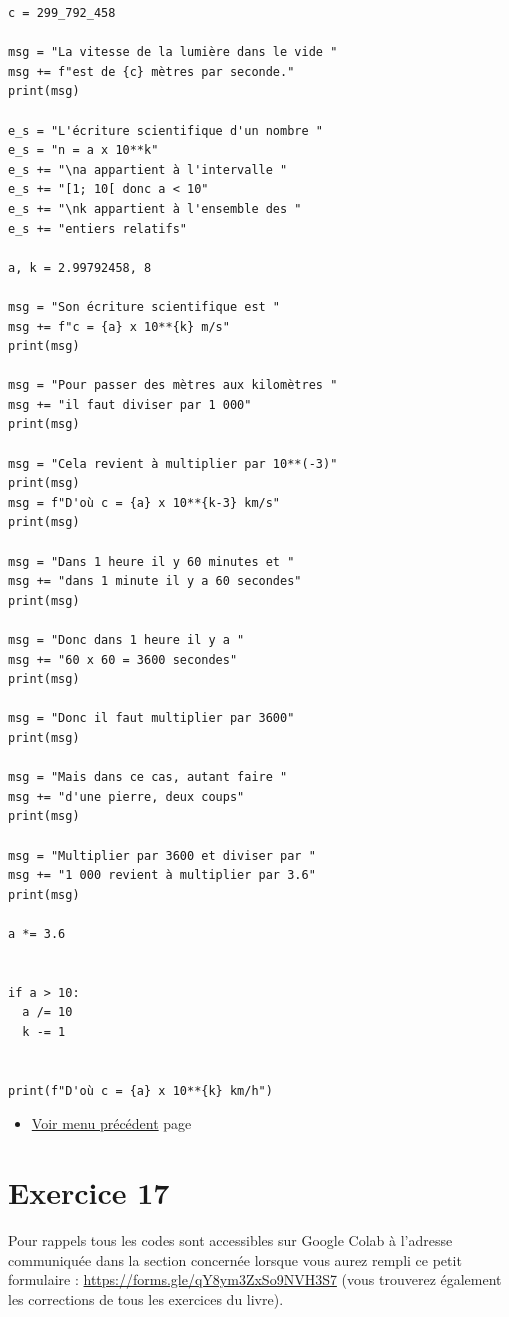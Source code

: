 \documentclass[a4paper,11pt]{book}
\begin{document}
\begin{verbatim}
c = 299_792_458

msg = "La vitesse de la lumière dans le vide "
msg += f"est de {c} mètres par seconde."
print(msg)

e_s = "L'écriture scientifique d'un nombre "
e_s = "n = a x 10**k"
e_s += "\na appartient à l'intervalle "
e_s += "[1; 10[ donc a < 10"
e_s += "\nk appartient à l'ensemble des "
e_s += "entiers relatifs"

a, k = 2.99792458, 8

msg = "Son écriture scientifique est "
msg += f"c = {a} x 10**{k} m/s"
print(msg)

msg = "Pour passer des mètres aux kilomètres "
msg += "il faut diviser par 1 000"
print(msg)

msg = "Cela revient à multiplier par 10**(-3)"
print(msg)
msg = f"D'où c = {a} x 10**{k-3} km/s"
print(msg)

msg = "Dans 1 heure il y 60 minutes et "
msg += "dans 1 minute il y a 60 secondes"
print(msg)

msg = "Donc dans 1 heure il y a "
msg += "60 x 60 = 3600 secondes"
print(msg)

msg = "Donc il faut multiplier par 3600"
print(msg)

msg = "Mais dans ce cas, autant faire "
msg += "d'une pierre, deux coups"
print(msg)

msg = "Multiplier par 3600 et diviser par "
msg += "1 000 revient à multiplier par 3.6"
print(msg)

a *= 3.6


if a > 10:
  a /= 10
  k -= 1


print(f"D'où c = {a} x 10**{k} km/h")
\end{verbatim}

\begin{itemize}
\item \hyperref[org7e69f0d]{Voir menu précédent}
page~\pageref{page:capacity5-menu}
\end{itemize}


\clearpage

\section{Exercice 17}
\label{sec:org4cba4cc}
\label{org4f79895}
\label{page:sec3.5.1exo17}

Pour rappels tous les codes sont accessibles sur Google Colab à
l'adresse communiquée dans la section concernée lorsque vous
aurez rempli ce petit formulaire : \url{https://forms.gle/qY8ym3ZxSo9NVH3S7}
(vous trouverez également les corrections de tous les exercices du
livre).
\end{document}
